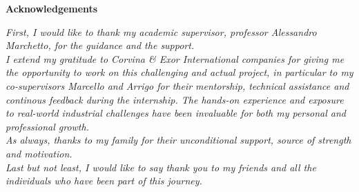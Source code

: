 \thispagestyle{empty}

\begin{center}
  {\bf \Huge Acknowledgements}
\end{center}

\vspace{4cm}


\emph{
  First, I would like to thank my academic supervisor, professor Alessandro Marchetto, for the guidance and the support.\\
  I extend my gratitude to Corvina \& Exor International companies for giving me the opportunity to work on this challenging and actual project, in particular to my co-supervisors Marcello and Arrigo for their mentorship, technical assistance and continous feedback during the internship. The hands-on experience and exposure to real-world industrial challenges have been invaluable for both my personal and professional growth.\\
  As always, thanks to my family for their unconditional support, source of strength and motivation.\\
  Last but not least, I would like to say thank you to my friends and all the individuals who have been part of this journey.
}
